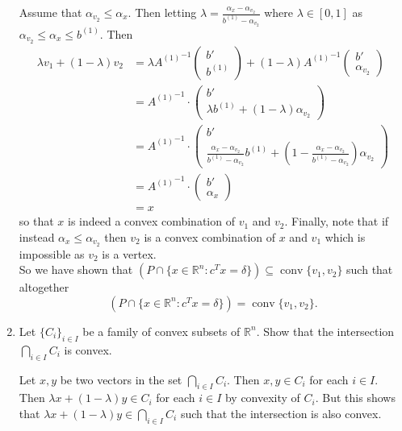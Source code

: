 \documentclass[11pt]{article}
\DeclareMathOperator{\conv}{conv}
\newcommand{\setR}{\mathbb{R}}
\renewcommand{\leq}{\leqslant}
\begin{document}
\begin{enumerate}[1)]
\begin{solution}
Assume that $\alpha_{v_2} \leq \alpha_x$. Then letting $\lambda = \frac{\alpha_x - \alpha_{v_2}}{b^{(1)}- \alpha_{v_2}}$ where $\lambda \in [0,1]$ as $\alpha_{v_2} \leq \alpha_x \leq b^{(1)}$. Then 
\begin{align*}
\lambda v_1 + (1- \lambda)v_2 & = \lambda {A^{(1)}}^{-1}\begin{pmatrix} b' \\ b^{(1)} \end{pmatrix} + (1 - \lambda) {A^{(1)}}^{-1}\begin{pmatrix} b' \\ \alpha_{v_2} \end{pmatrix} \\
& = {A^{(1)}}^{-1} \cdot \begin{pmatrix} b' \\ \lambda b^{(1)}  + (1-\lambda) \alpha_{v_2}\end{pmatrix} \\
& = {A^{(1)}}^{-1} \cdot \begin{pmatrix} b' \\ \frac{\alpha_x - \alpha_{v_2}}{b^{(1)}- \alpha_{v_2}} b^{(1)}  + \left(1-\frac{\alpha_x - \alpha_{v_2}}{b^{(1)}- \alpha_{v_2}}\right) \alpha_{v_2}\end{pmatrix} \\
& = {A^{(1)}}^{-1} \cdot \begin{pmatrix} b' \\ \alpha_x \end{pmatrix} \\
& = x
\end{align*}
so that $x$ is indeed a convex combination of $v_1$ and $v_2$. Finally, note that if instead $\alpha_{x} \leq \alpha_{v_2}$ then $v_2$ is a convex combination of $x$ and $v_1$ which is impossible as $v_2$ is a vertex. 
\\


So we have shown that $(P \cap \{x \in \setR^n: c^Tx = \delta\}) \subseteq \conv\{v_1, v_2\}$ such that altogether $$(P \cap \{x \in \setR^n: c^Tx = \delta\}) = \conv\{v_1, v_2\}.$$





\end{solution}

\item Let $\{C_i\}_{i\in I}$ be a family of convex subsets of $\setR^n$.
  Show that the intersection $\bigcap_{i\in I} C_i$ is convex.
  
  
  \begin{solution}
  Let $x, y$ be two vectors in the set $\bigcap_{i \in I} C_i$. Then $x, y \in C_i$ for each $i \in I$. Then $\lambda x + (1-\lambda)y \in C_i$ for each $i \in I$ by convexity of $C_i$. But this shows that $\lambda x + (1-\lambda)y \in \bigcap_{i \in I}C_i$ such that the intersection is also convex.
  

\end{solution}
\end{enumerate}
\end{document}
